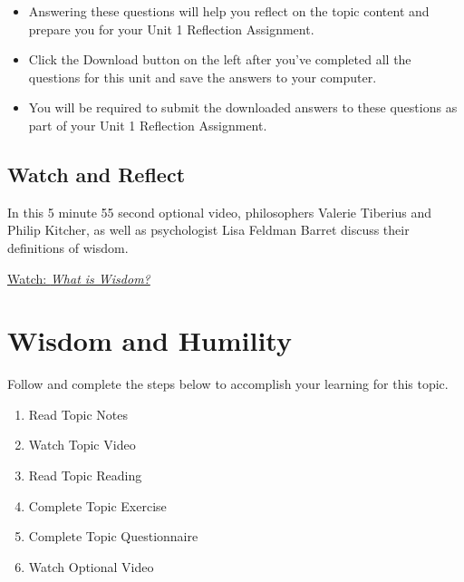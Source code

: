 \documentclass[
]{book}
\providecommand{\tightlist}{%
  \setlength{\itemsep}{0pt}\setlength{\parskip}{0pt}}
\begin{document}
\begin{reflect}
\begin{itemize}
\tightlist
\item
  Answering these questions will help you reflect on the topic content and prepare you for your Unit 1 Reflection Assignment.
\item
  Click the Download button on the left after you've completed all the questions for this unit and save the answers to your computer.
\item
  You will be required to submit the downloaded answers to these questions as part of your Unit 1 Reflection Assignment.
\end{itemize}
\end{reflect}

\hypertarget{watch-and-reflect-1}{%
\subsection*{Watch and Reflect}\label{watch-and-reflect-1}}

\begin{reflect}
In this 5 minute 55 second optional video, philosophers Valerie Tiberius and Philip Kitcher, as well as psychologist Lisa Feldman Barret discuss their definitions of wisdom.

\href{https://youtu.be/obqedyeUcwk}{Watch: \emph{What is Wisdom?}}
\end{reflect}

\hypertarget{wisdom-and-humility}{%
\section{Wisdom and Humility}\label{wisdom-and-humility}}

Follow and complete the steps below to accomplish your learning for this topic.

\begin{enumerate}
\def\labelenumi{\arabic{enumi}.}
\tightlist
\item
  Read Topic Notes
\item
  Watch Topic Video
\item
  Read Topic Reading
\item
  Complete Topic Exercise
\item
  Complete Topic Questionnaire
\item
  Watch Optional Video
\end{enumerate}
\end{document}
